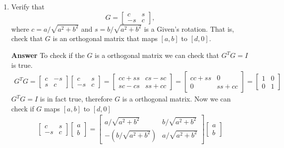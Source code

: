 \documentclass[10pt,a4paper]{article}
\theoremstyle{plain}
\theoremstyle{definition}
\begin{document}
\begin{enumerate}
  \item Verify that
  \begin{equation}\label{eq:givens}
    G = \begin{bmatrix}
    c & s\\-s&c
  \end{bmatrix},
\end{equation}
  where \(c = a/\sqrt{a^2 + b^2}\) and \(s = b/\sqrt{a^2 + b^2}\)
  is a Given's rotation.
  That is, check that \(G\) is an orthogonal matrix that maps \([a,b]\) to \([d,0]\).
  \item[\textbf{Answer}] 
  To check if the $G$ is a orthogonal matrix we can check that $G^TG=I$ is true.
  \begin{align*}
    G^TG=
    \begin{bmatrix}
      c & -s \\ s & c
    \end{bmatrix}
    \begin{bmatrix}
      c & s \\ -s & c
    \end{bmatrix}
    =
    \begin{bmatrix}
      cc+ss & cs-sc \\ sc-cs & ss+cc
    \end{bmatrix}
    =
    \begin{bmatrix}
      cc+ss & 0 \\ 0 & ss+cc
    \end{bmatrix}
    =
    \begin{bmatrix}
      1 & 0 \\ 0 & 1
    \end{bmatrix}
  \end{align*}
  $G^TG=I$ is in fact true, therefore $G$ is a orthogonal matrix. Now we can check if $G$ maps $[a,b]$ to $[d,0]$
  \begin{multline*}
    \begin{bmatrix}
      c & s \\ -s & c
    \end{bmatrix}
    \begin{bmatrix}
      a \\ b
    \end{bmatrix}
    =
    \begin{bmatrix}
      a/\sqrt{a^2+b^2} & b/\sqrt{a^2+b^2} \\ -(b/\sqrt{a^2+b^2}) & a/\sqrt{a^2+b^2}
    \end{bmatrix}
    \begin{bmatrix}
      a \\ b

\end{bmatrix}
\end{multline*}
\end{enumerate}
\end{document}

